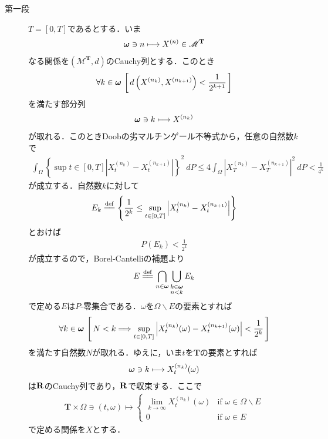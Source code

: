 	\begin{sketch}\mbox{}
		\begin{description}
			\item[第一段] $T = [0,T]$であるとする．いま
				\begin{align}
					{\boldsymbol \omega} \ni n \longmapsto X^{(n)} \in \mathscr{M}^{\mathbf{T}}
				\end{align}
				なる関係を$\left(\mathscr{M}^{\mathbf{T}},d\right)$のCauchy列とする．このとき
				\begin{align}
					\forall k \in {\boldsymbol \omega}\, \left[\, d\left( X^{(n_k)},X^{(n_{k+1})} \right) < \frac{1}{2^{k+1}}\, \right]
				\end{align}
				を満たす部分列
				\begin{align}
					{\boldsymbol \omega} \ni k \longmapsto X^{(n_k)}
				\end{align}
				が取れる．このときDoobの劣マルチンゲール不等式から，任意の自然数$k$で
				\begin{align}
					\int_\Omega \left\{ \sup{t \in [0,T]}{\left|X_t^{(n_k)} - X_t^{(n_{k+1})}\right|} \right\}^2\ dP
					\leq 4 \int_\Omega \left|X_T^{(n_k)} - X_T^{(n_{k+1})}\right|^2\ dP
					< \frac{1}{4^k}
				\end{align}
				が成立する．自然数$k$に対して
				\begin{align}
					E_k \defeq \left\{ \frac{1}{2^k} \leq \sup{t \in [0,T]}{\left|X_t^{(n_k)} - X_t^{(n_{k+1})}\right|} \right\}
				\end{align}
				とおけば
				\begin{align}
					P(E_k) < \frac{1}{2^k}
				\end{align}
				が成立するので，Borel-Cantelliの補題より
				\begin{align}
					E \defeq \bigcap_{n \in \Natural} \bigcup_{\substack{k \in \Natural \\ n < k}} E_k
				\end{align}
				で定める$E$は$P$-零集合である．$\omega$を$\Omega \backslash E$の要素とすれば
				\begin{align}
					\forall k \in {\boldsymbol \omega}\,
					\left[\, N < k \Longrightarrow \operatorname*{sup}_{t \in [0,T]} \left|X_t^{(n_k)}(\omega) - X_t^{(n_{k+1})}(\omega)\right| < \frac{1}{2^k}\, \right]
					\label{fom:thm_pseudo_metric_on_square_integrable_martingales_1}
				\end{align}
				を満たす自然数$N$が取れる．ゆえに，いま$t$を$\mathbf{T}$の要素とすれば
				\begin{align}
					{\boldsymbol \omega} \ni k \longmapsto X_t^{(n_k)}(\omega)
				\end{align}
				は$\mathbf{R}$のCauchy列であり，$\mathbf{R}$で収束する．ここで
				\begin{align}
					\mathbf{T} \times \Omega \ni (t,\omega) \longmapsto
					\begin{cases}
						\lim_{k \to \infty} X_t^{(n_k)}(\omega) & \mbox{if } \omega \in \Omega \backslash E \\
						0 & \mbox{if } \omega \in E
					\end{cases} 
				\end{align}
				で定める関係を$X$とする．
				

\end{description}
\end{sketch}
